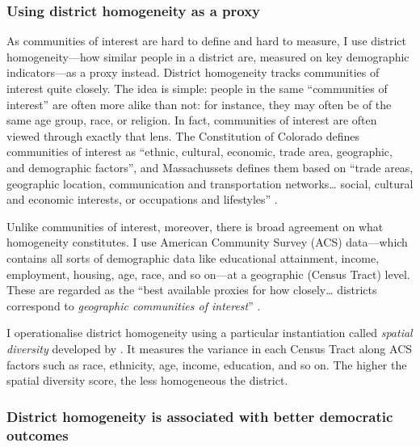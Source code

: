 \documentclass[]{article}
\begin{document}
\hypertarget{using-district-homogeneity-as-a-proxy}{%
\subsubsection{Using district homogeneity as a
proxy}\label{using-district-homogeneity-as-a-proxy}}

As communities of interest are hard to define and hard to measure, I use
district homogeneity---how similar people in a district are, measured on
key demographic indicators---as a proxy instead. District homogeneity
tracks communities of interest quite closely. The idea is simple: people
in the same ``communities of interest'' are often more alike than not:
for instance, they may often be of the same age group, race, or
religion. In fact, communities of interest are often viewed through
exactly that lens. The Constitution of Colorado defines communities of
interest as ``ethnic, cultural, economic, trade area, geographic, and
demographic factors'', and Massachussets defines them based on ``trade
areas, geographic location, communication and transportation
networks\ldots{} social, cultural and economic interests, or occupations
and lifestyles'' \citep{brennan}.

Unlike communities of interest, moreover, there is broad agreement on
what homogeneity constitutes. I use American Community Survey (ACS)
data---which contains all sorts of demographic data like educational
attainment, income, employment, housing, age, race, and so on---at a
geographic (Census Tract) level. These are regarded as the ``best
available proxies for how closely\ldots{} districts correspond to
\emph{geographic communities of interest}'' \citet[p.~283]{steph2012}.

I operationalise district homogeneity using a particular instantiation
called \emph{spatial diversity} developed by \cite{steph2012}. It
measures the variance in each Census Tract along ACS factors such as
race, ethnicity, age, income, education, and so on. The higher the
spatial diversity score, the less homogeneous the district.

\hypertarget{district-homogeneity-is-associated-with-better-democratic-outcomes}{%
\subsubsection{District homogeneity is associated with better democratic
outcomes}\label{district-homogeneity-is-associated-with-better-democratic-outcomes}}
\end{document}
